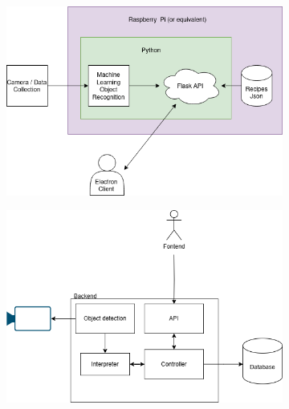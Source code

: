 \documentclass{article}
\begin{document}
\begin{figure}[t]
  \centering
  \begin{subfigure}{0.45\linewidth}
    \includegraphics[width=\linewidth]{assets/first-architecture.png}
    \caption{}
    \label{fig:architectureA}
  \end{subfigure}
  \hfill
  \begin{subfigure}{0.45\linewidth}
    \includegraphics[width=\linewidth]{assets/second-architecture.png}
    \caption{}
    \label{fig:architectureB}
  \end{subfigure}
  \vfill
  \begin{subfigure}{0.5\linewidth}

\end{subfigure}
\end{figure}
\end{document}
